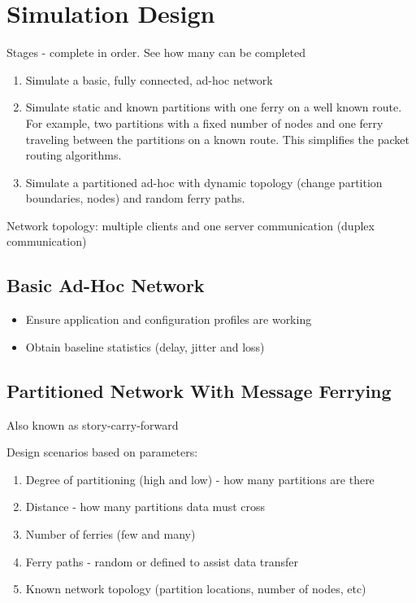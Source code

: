 \chapter{Simulation Design} 

Stages - complete in order. 
See how many can be completed

\begin{enumerate}
\item Simulate a basic, fully connected, ad-hoc network

\item Simulate static and known partitions with one ferry on a well known route. 
For example, two partitions with a fixed number of nodes and one ferry traveling between the partitions on a known route.
This simplifies the packet routing algorithms.
\item Simulate a partitioned ad-hoc with dynamic topology (change partition boundaries, nodes) and random ferry paths.
\end{enumerate}

Network topology: multiple clients and one server communication (duplex communication)

\section{Basic Ad-Hoc Network}

\begin{itemize}
\item Ensure application and configuration profiles are working
\item Obtain baseline statistics (delay, jitter and loss)
\end{itemize}

\section{Partitioned Network With Message Ferrying}

Also known as story-carry-forward

Design scenarios based on parameters:

\begin{enumerate}
\item Degree of partitioning (high and low) - how many partitions are there
\item Distance - how many partitions data must cross
\item Number of ferries (few and many)
\item Ferry paths - random or defined to assist data transfer
\item Known network topology (partition locations, number of nodes, etc)
\end{enumerate}